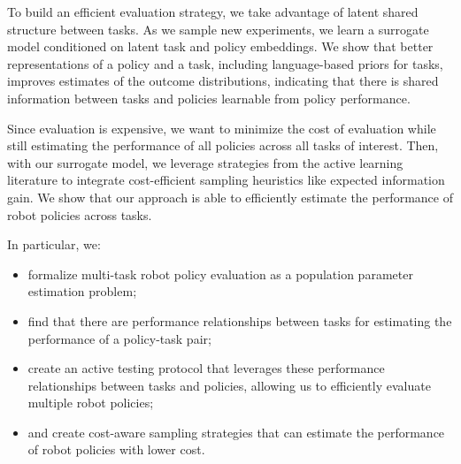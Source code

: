 To build an efficient evaluation strategy, we take advantage of latent shared structure between tasks. 
As we sample new experiments, we learn a surrogate model conditioned on latent task and policy embeddings. 
We show that better representations of a policy and a task, including language-based priors for tasks, improves estimates of the outcome distributions, indicating that there is shared information between tasks and policies learnable from policy performance.

Since evaluation is expensive, we want to minimize the cost of evaluation while still estimating the performance of all policies across all tasks of interest.
Then, with our surrogate model, we leverage strategies from the active learning literature to integrate cost-efficient sampling heuristics like expected information gain.
We show that our approach is able to efficiently estimate the performance of robot policies across tasks.





In particular, we:
\begin{itemize}
    \item formalize multi-task robot policy evaluation as a population parameter estimation problem;
    \item find that there are performance relationships between tasks for estimating the performance of a policy-task pair;
    \item create an active testing protocol that leverages these performance relationships between tasks and policies, allowing us to efficiently evaluate multiple robot policies;
    \item and create cost-aware sampling strategies that can estimate the performance of robot policies with lower cost.
\end{itemize}